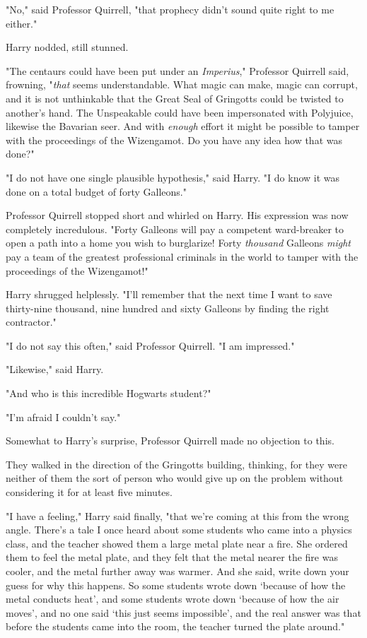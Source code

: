 "No," said Professor Quirrell, "that prophecy didn't sound quite right to me
either."

Harry nodded, still stunned.

"The centaurs could have been put under an \emph{Imperius}," Professor Quirrell
said, frowning, "\emph{that} seems understandable. What magic can make, magic
can corrupt, and it is not unthinkable that the Great Seal of Gringotts could
be twisted to another's hand. The Unspeakable could have been impersonated with
Polyjuice, likewise the Bavarian seer. And with \emph{enough} effort it might
be possible to tamper with the proceedings of the Wizengamot. Do you have any
idea how that was done?"

"I do not have one single plausible hypothesis," said Harry. "I do know it was
done on a total budget of forty Galleons."

Professor Quirrell stopped short and whirled on Harry. His expression was now
completely incredulous. "Forty Galleons will pay a competent ward-breaker to
open a path into a home you wish to burglarize! Forty \emph{thousand} Galleons
\emph{might} pay a team of the greatest professional criminals in the world to
tamper with the proceedings of the Wizengamot!"

Harry shrugged helplessly. "I'll remember that the next time I want to save
thirty-nine thousand, nine hundred and sixty Galleons by finding the right
contractor."

"I do not say this often," said Professor Quirrell. "I am impressed."

"Likewise," said Harry.

"And who is this incredible Hogwarts student?"

"I'm afraid I couldn't say."

Somewhat to Harry's surprise, Professor Quirrell made no objection to this.

They walked in the direction of the Gringotts building, thinking, for they were
neither of them the sort of person who would give up on the problem without
considering it for at least five minutes.

"I have a feeling," Harry said finally, "that we're coming at this from the
wrong angle. There's a tale I once heard about some students who came into a
physics class, and the teacher showed them a large metal plate near a fire. She
ordered them to feel the metal plate, and they felt that the metal nearer the
fire was cooler, and the metal further away was warmer. And she said, write
down your guess for why this happens. So some students wrote down `because of
how the metal conducts heat', and some students wrote down `because of how the
air moves', and no one said `this just seems impossible', and the real answer
was that before the students came into the room, the teacher turned the plate
around."


